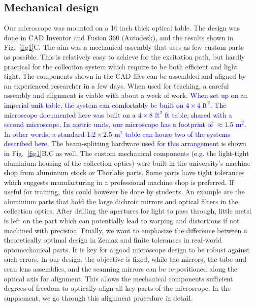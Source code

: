 \documentclass[10pt,letterpaper]{article}
\begin{document}
\subsection*{Mechanical design}
Our microscope was mounted on a 16 inch thick optical table. The design was done in CAD Inventor and Fusion 360 (Autodesk), and the results shown in Fig.~\ref{fig1}C. The aim was a mechanical assembly that uses as few custom parts as possible. This is relatively easy to achieve for the excitation path, but hardly practical for the collection system which require to be both efficient and light tight. The components shown in the CAD files can be assembled and aligned by an experienced researcher in a few days. When used for teaching, a careful assembly and alignment is viable with about a week of work. \textcolor{blue}{When set up on an imperial-unit table, the system can comfortably be built on $4\times4 \text{ ft}^2$. The microscope documented here was built on a $4\times8\text{ ft}^2$ ft table, shared with a second microscope. In metric units, our microscope has a footprint of $\approx 1.5\text{ m}^2$. In other words, a standard $1.2\times2.5\text{ m}^2$ table can house two of the systems described here.} The beam-splitting hardware \textcolor{blue}{used for this arrangement} is shown in Fig.~\ref{fig1}B,C as well.\newline
The custom mechanical components (e.g. the light-tight aluminium housing of the collection optics) were built in the university's machine shop from aluminium stock or Thorlabs parts. Some parts have tight tolerances which suggests manufacturing in a professional machine shop is preferred. If useful for training, this could however be done by students. An example are the aluminium parts that hold the large dichroic mirrors and optical filters in the collection optics. After drilling the apertures for light to pass through, little metal is left on the part which can potentially lead to warping and distortions if not machined with precision.\newline
Finally, we want to emphasize the difference between a theoretically optimal design in Zemax and finite tolerances in real-world optomechanical parts. It is key for a good microscope design to be robust against such errors. In our design, the objective is fixed, while the mirrors, the tube and scan lens assemblies, and the scanning mirrors can be re-positioned along the optical axis for alignment. This allows the mechanical components sufficient degrees of freedom to optically align all key parts of the microscope. In the supplement, we go through this alignment procedure in detail.
\end{document}
